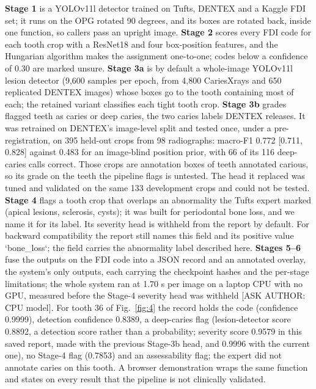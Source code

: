 \documentclass[conference]{IEEEtran}
\begin{document}
\textbf{Stage 1} is a YOLOv11l detector trained on Tufts, DENTEX and a Kaggle FDI set; it runs on the OPG rotated 90 degrees, and its boxes are rotated back, inside one function, so callers pass an upright image. \textbf{Stage 2} scores every FDI code for each tooth crop with a ResNet18 and four box-position features, and the Hungarian algorithm makes the assignment one-to-one; codes below a confidence of 0.30 are marked unsure. \textbf{Stage 3a} is by default a whole-image YOLOv11l lesion detector (9,600 samples per epoch, from 4,800 CariesXrays and 650 replicated DENTEX images) whose boxes go to the tooth containing most of each; the retained variant classifies each tight tooth crop. \textbf{Stage 3b} grades flagged teeth as caries or deep caries, the two caries labels DENTEX releases. It was retrained on DENTEX's image-level split and tested once, under a pre-registration, on 395 held-out crops from 98 radiographs: macro-F1 0.772 [0.711, 0.828] against 0.483 for an image-blind position prior, with 66 of its 116 deep-caries calls correct. Those crops are annotation boxes of teeth annotated carious, so its grade on the teeth the pipeline flags is untested. The head it replaced was tuned and validated on the same 133 development crops and could not be tested. \textbf{Stage 4} flags a tooth crop that overlaps an abnormality the Tufts expert marked (apical lesions, sclerosis, cysts); it was built for periodontal bone loss, and we name it for its label. Its severity head is withheld from the report by default. For backward compatibility the report still names this field and its positive value `bone\_loss`; the field carries the abnormality label described here. \textbf{Stages 5–6} fuse the outputs on the FDI code into a JSON record and an annotated overlay, the system's only outputs, each carrying the checkpoint hashes and the per-stage limitations; the whole system ran at 1.70 s per image on a laptop CPU with no GPU, measured before the Stage-4 severity head was withheld [ASK AUTHOR: CPU model]. For tooth 36 of Fig.~\ref{fig:4} the record holds the code (confidence 0.9999), detection confidence 0.8389, a deep-caries flag (lesion-detector score 0.8892, a detection score rather than a probability; severity score 0.9579 in this saved report, made with the previous Stage-3b head, and 0.9996 with the current one), no Stage-4 flag (0.7853) and an assessability flag; the expert did not annotate caries on this tooth. A browser demonstration wraps the same function and states on every result that the pipeline is not clinically validated.
\end{document}
